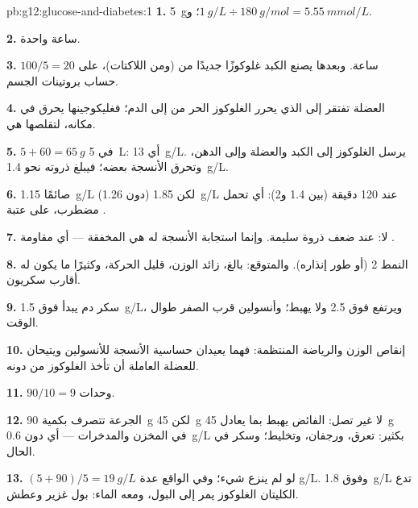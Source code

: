 \begin{solution}{pb:g12:glucose-and-diabetes:1}
\textbf{1.} \qty{5}{g}؛ و$\qty{1}{g/L} \div \qty{180}{g/mol} = \qty{5.55}{mmol/L}$.

\textbf{2.} ساعة واحدة.

\textbf{3.} $100/5 = 20$ ساعة. وبعدها يصنع الكبد غلوكوزًا جديدًا من
 (ومن اللاكتات)، على حساب بروتينات الجسم.

\textbf{4.}  العضلة تفتقر إلى  الذي يحرر الغلوكوز الحر من
 إلى الدم؛ فغليكوجينها يحرق في مكانه، لتقلصها هي.

\textbf{5.} $5 + 60 = \qty{65}{g}$ في \qty{5}{L}: أي \qty{13}{g/L}.
 يرسل الغلوكوز إلى  الكبد والعضلة وإلى الدهن، وتحرق
الأنسجة بعضه؛ فيبلغ  ذروته نحو \qty{1.4}{g/L}.

\textbf{6.} صائمًا \qty{1.15}{g/L} (دون 1.26) لكن \qty{1.85}{g/L} عند
120 دقيقة (بين 1.4 و2): أي تحمل مضطرب، على عتبة .

\textbf{7.} لا:  عند ضعف ذروة سليمة. وإنما استجابة الأنسجة
له هي المخفقة --- أي مقاومة .

\textbf{8.} النمط 2 (أو طور إنذاره). والمتوقع: بالغ، زائد الوزن، قليل
الحركة، وكثيرًا ما يكون له أقارب سكريون.

\textbf{9.} سكر دم يبدأ فوق \qty{1.5}{g/L}، ويرتفع فوق \num{2.5} ولا
يهبط؛ وأنسولين قرب الصفر طوال الوقت.

\textbf{10.} إنقاص الوزن والرياضة المنتظمة: فهما يعيدان حساسية الأنسجة
للأنسولين ويتيحان للعضلة العاملة أن تأخذ الغلوكوز من دونه.

\textbf{11.} $90/10 = 9$ وحدات.

\textbf{12.} الجرعة تتصرف بكمية \qty{90}{g} لكن \qty{45}{g} لا غير تصل:
 الفائض يهبط  بما يعادل \qty{45}{g} في المخزن
والمدخرات --- أي دون \qty{0.6}{g/L} بكثير: تعرق، ورجفان، وتخليط؛
وسكر في الحال.

\textbf{13.} $(5 + 90)/5 = \qty{19}{g/L}$ لو لم ينزع شيء؛ وفي الواقع
عدة \unit{g/L}. وفوق \qty{1.8}{g/L} تدع الكليتان الغلوكوز يمر إلى
البول، ومعه الماء: بول غزير وعطش.


\end{solution}
